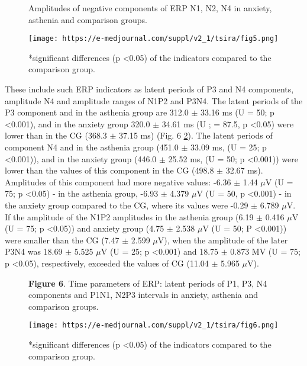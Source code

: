 \documentclass[twocolumn]{article}
\begin{document}
\begin{figure}
\caption{Amplitudes of negative components of ERP N1, N2, N4 in anxiety, asthenia and comparison groups.}
\label{fig5}
\texttt{[image: https://e-medjournal.com/suppl/v2\_1/tsira/fig5.png]}
\caption*{*significant differences (p \textless{}0.05) of the indicators compared to the comparison group. }
\end{figure}
\par These include such ERP indicators as latent periods of P3 and N4 components, amplitude N4 and amplitude ranges of N1P2 and P3N4. The latent periods of the P3 component and in the asthenia group are 312.0 $\pm$ 33.16 ms (U = 50; p \textless{}0.001), and in the anxiety group 320.0 $\pm$ 34.61 ms (U \cite{bib15}; \cite{bib20} = 87.5, p \textless{}0.05) were lower than in the CG (368.3 $\pm$ 37.15 ms) (Fig. 6 \ref{fig6}). The latent periods of component N4 and in the asthenia group (451.0 $\pm$ 33.09 ms, (U = 25; p \textless{}0.001)), and in the anxiety group (446.0 $\pm$ 25.52 ms, (U = 50; p \textless{}0.001)) were lower than the values of this component in the CG (498.8 $\pm$ 32.67 ms). Amplitudes of this component had more negative values: -6.36 $\pm$ 1.44 $\mu$V (U = 75; p \textless{}0.05) - in the asthenia group, -6.93 $\pm$ 4.379 $\mu$V (U = 50, p \textless{}0.001) - in the anxiety group compared to the CG, where its values were -0.29 $\pm$ 6.789 $\mu$V. If the amplitude of the N1P2 amplitudes in the asthenia group (6.19 $\pm$ 0.416 $\mu$V (U = 75; p \textless{}0.05)) and anxiety group (4.75 $\pm$ 2.538 $\mu$V (U = 50; P \textless{}0.001)) were smaller than the CG (7.47 $\pm$ 2.599 $\mu$V), when the amplitude of the later P3N4 was 18.69 $\pm$ 5.525 $\mu$V (U = 25; p \textless{}0.001) and 18.75 $\pm$ 0.873 MV (U = 75; p \textless{}0.05), respectively, exceeded the values of CG (11.04 $\pm$ 5.965 $\mu$V). 
\begin{figure}
\caption{
                     \textbf{Figure 6}. Time parameters of ERP: latent periods of P1, P3, N4 components and P1N1, N2P3 intervals in anxiety, asthenia and comparison groups.}
\label{fig6}
\texttt{[image: https://e-medjournal.com/suppl/v2\_1/tsira/fig6.png]}
\caption*{*significant differences (p \textless{}0.05) of the indicators compared to the comparison group.}
\end{figure}
\end{document}
